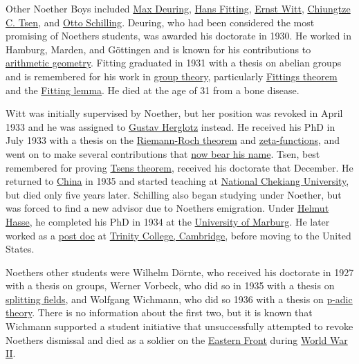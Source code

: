 Other Noether Boys included \href{https://en.wikipedia.org/wiki/Max_Deuring}{Max Deuring}, \href{https://en.wikipedia.org/wiki/Hans_Fitting}{Hans Fitting}, \href{https://en.wikipedia.org/wiki/Ernst_Witt}{Ernst Witt}, \href{https://en.wikipedia.org/wiki/Chiungtze_C._Tsen}{Chiungtze C. Tsen}, and \href{https://en.wikipedia.org/wiki/Otto_Schilling}{Otto Schilling}. Deuring, who had been considered the most promising of Noether\textquotesingle s students, was awarded his doctorate in 1930. He worked in Hamburg, Marden, and Göttingen and is known for his contributions to \href{https://en.wikipedia.org/wiki/Arithmetic_geometry}{arithmetic geometry}. Fitting graduated in 1931 with a thesis on abelian groups and is remembered for his work in \href{https://en.wikipedia.org/wiki/Group_theory}{group theory}, particularly \href{https://en.wikipedia.org/wiki/Fitting's_theorem}{Fitting\textquotesingle s theorem} and the \href{https://en.wikipedia.org/wiki/Fitting_lemma}{Fitting lemma}. He died at the age of 31 from a bone disease.

Witt was initially supervised by Noether, but her position was revoked in April 1933 and he was assigned to \href{https://en.wikipedia.org/wiki/Gustav_Herglotz}{Gustav Herglotz} instead. He received his PhD in July 1933 with a thesis on the \href{https://en.wikipedia.org/wiki/Riemann-Roch_theorem}{Riemann-Roch theorem} and \href{https://en.wikipedia.org/wiki/Zeta-function}{zeta-functions}, and went on to make several contributions that \href{https://en.wikipedia.org/wiki/List_of_things_named_after_Ernst_Witt}{now bear his name}. Tsen, best remembered for proving \href{https://en.wikipedia.org/wiki/Tsen's_theorem}{Tsen\textquotesingle s theorem}, received his doctorate that December. He returned to \href{https://en.wikipedia.org/wiki/China}{China} in 1935 and started teaching at \href{https://en.wikipedia.org/wiki/National_Chekiang_University}{National Chekiang University}, but died only five years later. Schilling also began studying under Noether, but was forced to find a new advisor due to Noether\textquotesingle s emigration. Under \href{https://en.wikipedia.org/wiki/Helmut_Hasse}{Helmut Hasse}, he completed his PhD in 1934 at the \href{https://en.wikipedia.org/wiki/University_of_Marburg}{University of Marburg}. He later worked as a \href{https://en.wikipedia.org/wiki/Post_doc}{post doc} at \href{https://en.wikipedia.org/wiki/Trinity_College,_Cambridge}{Trinity College, Cambridge}, before moving to the United States.

Noether\textquotesingle s other students were Wilhelm Dörnte, who received his doctorate in 1927 with a thesis on groups, Werner Vorbeck, who did so in 1935 with a thesis on \href{https://en.wikipedia.org/wiki/Splitting_field}{splitting fields}, and Wolfgang Wichmann, who did so 1936 with a thesis on \href{https://en.wikipedia.org/wiki/P-adic_number}{p-adic theory}. There is no information about the first two, but it is known that Wichmann supported a student initiative that unsuccessfully attempted to revoke Noether\textquotesingle s dismissal and died as a soldier on the \href{https://en.wikipedia.org/wiki/Eastern_Front_(World_War_II)}{Eastern Front} during \href{https://en.wikipedia.org/wiki/World_War_II}{World War II}.


